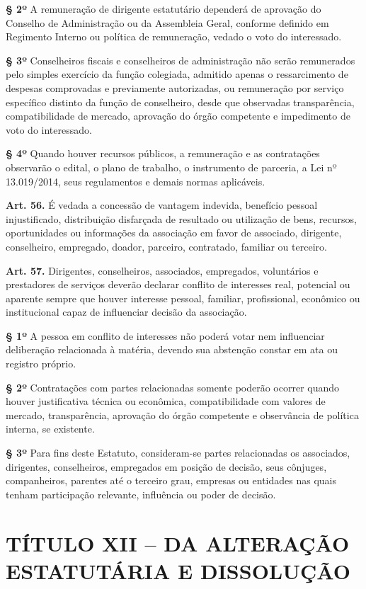 \documentclass[11pt,a4paper]{article}
\begin{document}
\textbf{§ 2º} A remuneração de dirigente estatutário dependerá de aprovação do Conselho de Administração ou da Assembleia Geral, conforme definido em Regimento Interno ou política de remuneração, vedado o voto do interessado.

\textbf{§ 3º} Conselheiros fiscais e conselheiros de administração não serão remunerados pelo simples exercício da função colegiada, admitido apenas o ressarcimento de despesas comprovadas e previamente autorizadas, ou remuneração por serviço específico distinto da função de conselheiro, desde que observadas transparência, compatibilidade de mercado, aprovação do órgão competente e impedimento de voto do interessado.

\textbf{§ 4º} Quando houver recursos públicos, a remuneração e as contratações observarão o edital, o plano de trabalho, o instrumento de parceria, a Lei nº 13.019/2014, seus regulamentos e demais normas aplicáveis.

\textbf{Art. 56.} É vedada a concessão de vantagem indevida, benefício pessoal injustificado, distribuição disfarçada de resultado ou utilização de bens, recursos, oportunidades ou informações da associação em favor de associado, dirigente, conselheiro, empregado, doador, parceiro, contratado, familiar ou terceiro.

\textbf{Art. 57.} Dirigentes, conselheiros, associados, empregados, voluntários e prestadores de serviços deverão declarar conflito de interesses real, potencial ou aparente sempre que houver interesse pessoal, familiar, profissional, econômico ou institucional capaz de influenciar decisão da associação.

\textbf{§ 1º} A pessoa em conflito de interesses não poderá votar nem influenciar deliberação relacionada à matéria, devendo sua abstenção constar em ata ou registro próprio.

\textbf{§ 2º} Contratações com partes relacionadas somente poderão ocorrer quando houver justificativa técnica ou econômica, compatibilidade com valores de mercado, transparência, aprovação do órgão competente e observância de política interna, se existente.

\textbf{§ 3º} Para fins deste Estatuto, consideram-se partes relacionadas os associados, dirigentes, conselheiros, empregados em posição de decisão, seus cônjuges, companheiros, parentes até o terceiro grau, empresas ou entidades nas quais tenham participação relevante, influência ou poder de decisão.

\section*{TÍTULO XII -- DA ALTERAÇÃO ESTATUTÁRIA E DISSOLUÇÃO}
\end{document}
